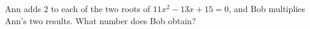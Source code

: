 Ann adds $2$ to each of the two roots of $11x^2-13x+15=0$, and Bob multiplies Ann's two results. What number does Bob obtain?
